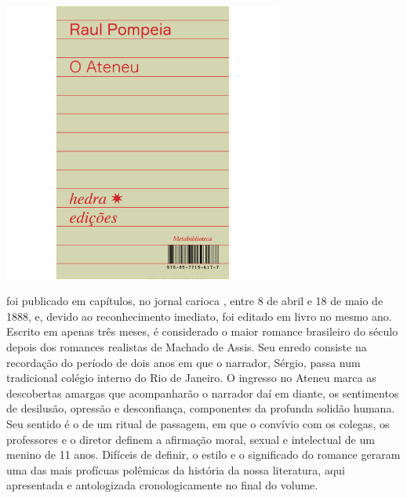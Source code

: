\pagebreak

\begin{center}
\hspace*{.5cm}\includegraphics[width=92mm]{./grid/ateneu.jpg}
\end{center}

\hspace*{-7cm}\hrulefill\hspace*{-7cm}

\medskip

 foi publicado em capítulos,
no jornal carioca {}, entre 8 de abril e 18 de maio de 1888, e,
devido ao reconhecimento imediato, foi editado em livro no mesmo ano.
Escrito em apenas três meses, é considerado o maior romance brasileiro do
século  depois dos romances realistas de Machado de Assis. Seu
enredo consiste na recordação do período de dois anos em que o narrador,
Sérgio, passa num tradicional colégio interno do Rio de Janeiro. O
ingresso no Ateneu marca as descobertas amargas que acompanharão o
narrador daí em diante, os sentimentos de desilusão, opressão e
desconfiança, componentes da profunda solidão humana. Seu sentido é o
de um ritual de passagem, em que o convívio com os colegas, os
professores e o diretor definem a afirmação moral, sexual e intelectual
de um menino de 11 anos. Difíceis de definir, o estilo e o
significado do romance geraram uma das mais profícuas polêmicas da
história da nossa literatura, aqui apresentada e antologizada
cronologicamente no final do volume.


\vfill
\enlargethispage{\baselineskip}


\hspace*{-.4cm}\begin{minipage}[c]{.5\linewidth}
\small{
{}}
\end{minipage}

